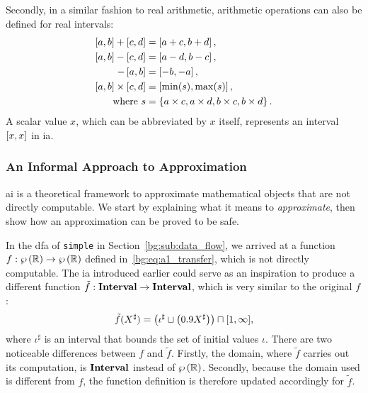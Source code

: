 Secondly, in a similar fashion to real arithmetic, arithmetic operations can
also be defined for real intervals:
\begin{equation}
    \begin{aligned}
        \left[{a}, {b}\right] + \left[{c}, {d}\right] &= \left[{a + c}, {b + d}\right], \\
        \left[{a}, {b}\right] - \left[{c}, {d}\right] &= \left[{a - d}, {b - c}\right], \\
        -\left[{a}, {b}\right] &= \left[{-b}, {-a}\right], \\
        \left[{a}, {b}\right] \times \left[{c}, {d}\right]
            &= \left[{\min(s)}, {\max(s)}\right], \\
        \text{where~} s &= \left\{
            a \times c, a \times d, b \times c, b \times d
        \right\}.
    \end{aligned}
    \label{bg:eq:interval_operations}
\end{equation}
A scalar value $x$, which can be abbreviated by $x$ itself, represents an
interval $\left[{x}, {x}\right]$ in \gls{ia}.

\subsubsection{An Informal Approach to Approximation}
\label{bg:ssub:informal}

\Gls{ai} is a theoretical framework to approximate mathematical objects
that are not directly computable.  We start by explaining what it means to
\emph{approximate}, then show how an approximation can be proved to be safe.

In the \gls{dfa} of \verb|simple| in Section~\ref{bg:sub:data_flow}, we
arrived at a function $f: \wp\left({\mathbb{R}}\right) \to \wp\left({\mathbb{R}}\right)$ defined
in~\eqref{bg:eq:a1_transfer}, which is not directly computable.  The \gls{ia}
introduced earlier could serve as an inspiration to produce a different
function $\tilde{f}: \mathbf{Interval} \to \mathbf{Interval}$, which is very similar to
the original $f$:
\begin{equation}
    \tilde{f}(X^\sharp) = \left(
        \iota^\sharp \sqcup \left( 0.9 X^\sharp \right)
    \right) \sqcap [1, \infty],
    \label{bg:eq:a1_transfer_interval}
\end{equation}
where $\iota^\sharp$ is an interval that bounds the set of initial values
$\iota$.  There are two noticeable differences between $f$ and $\tilde{f}$.
Firstly, the domain, where $\tilde{f}$ carries out its computation, is
$\mathbf{Interval}$ instead of $\wp\left({\mathbb{R}}\right)$.  Secondly, because the domain
used is different from $f$, the function definition is therefore updated
accordingly for $\tilde{f}$.

